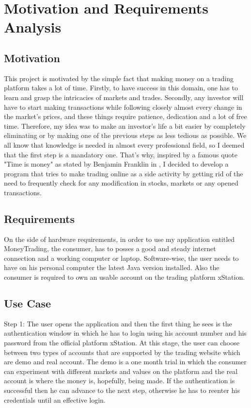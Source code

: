 \documentclass[12pt,a4paper]{report}
\begin{document}
\chapter{Motivation and Requirements Analysis}
\section{Motivation}
This project is motivated by the simple fact that making money on a trading platform takes a lot of time. Firstly, to have success in this domain, one has to learn and grasp the intricacies of markets and trades. Secondly, any investor will have to start making transactions while following closely almost every change in the market's prices, and these things require patience, dedication and a lot of free time. Therefore, my idea was to make an investor's life a bit easier by completely eliminating or by making one of the previous steps as less tedious as possible. We all know that knowledge is needed in almost every professional field, so I deemed that the first step is a mandatory one. That's why, inspired by a famous quote "Time is money" as stated by Benjamin Franklin in \cite{timeIsMoney}, I decided to develop a program that tries to make trading online as a side activity by getting rid of the need to frequently check for any modification in stocks, markets or any opened transactions.

\section{Requirements}
On the side of hardware requirements, in order to use my application entitled MoneyTrading, the consumer, has to posses a good and steady internet connection and a working computer or laptop. Software-wise, the user needs to have on his personal computer the latest Java version installed. Also the consumer is required to own an usable account on the trading platform xStation.

\section{Use Case}
Step 1: The user opens the application and then the first thing he sees is the authentication window in which he has to login using his account number and his password from the official platform xStation. At this stage, the user can choose between two types of accounts that are supported by the trading website which are demo and real account. The demo is a one month trial in which the consumer can experiment with different markets and values on the platform and the real account is where the money is, hopefully, being made. If the authentication is successful then he can advance to the next step, otherwise he has to reenter his credentials until an effective login.
\end{document}
